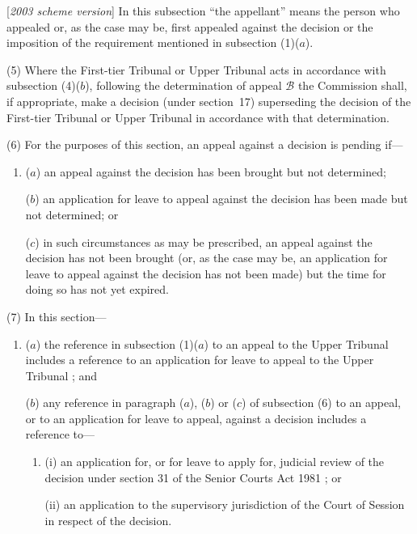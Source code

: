 \documentclass[12pt,a4paper]{article}
\begin{document}
[\emph{2003 scheme version}] In this subsection “the appellant” means the person who appealed or, as the case may be, first appealed against the decision 
or the imposition of the requirement  %
mentioned in subsection (1)($a$).

(5) Where the 
First-tier Tribunal or Upper Tribunal  %
acts in accordance with subsection (4)($b$), following the determination of appeal $\mathcal{B}$ the 
Commission  %
shall, if appropriate, make a decision (under section~17) superseding the decision of the 
First-tier Tribunal or Upper Tribunal  %
in accordance with that determination.

(6) For the purposes of this section, an appeal against a decision is pending if—
\begin{enumerate}\item[]
($a$) an appeal against the decision has been brought but not determined;

($b$) an application for leave to appeal against the decision has been made but not determined; or

($c$) in such circumstances as may be prescribed, an appeal against the decision has not been brought (or, as the case may be, an application for leave to appeal against the decision has not been made) but the time for doing so has not yet expired.
\end{enumerate}

(7) In this section—
\begin{enumerate}\item[]
($a$) the reference in subsection (1)($a$) to an appeal to 
the Upper Tribunal   %
includes a reference to an application for leave to appeal to 
the Upper Tribunal%
; and

($b$) any reference in paragraph ($a$), ($b$) or ($c$) of subsection (6) to an appeal, or to an application for leave to appeal, against a decision includes a reference to—
\begin{enumerate}\item[]
(i) an application for, or for leave to apply for, judicial review of the decision under section 31 of the 
Senior Courts Act 1981%
; or

(ii) an application to the supervisory jurisdiction of the Court of Session in respect of the decision.
\end{enumerate}
\end{enumerate}
\end{document}

